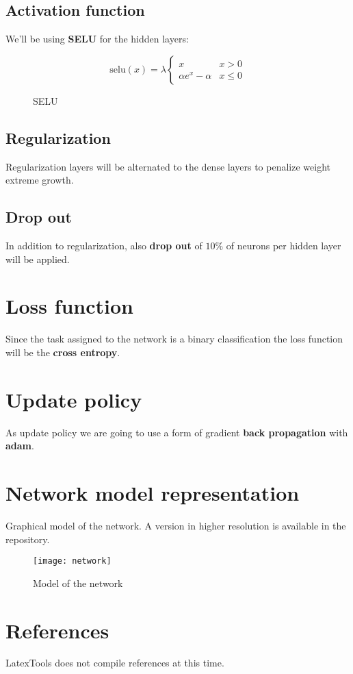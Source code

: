 \section{Activation function}
We'll be using \textbf{SELU} for the hidden layers:

\begin{figure}
	\[
		\text{selu}(x) = \lambda \begin{cases}
			x                 & x > 0    \\
			\alpha e^x-\alpha & x \leq 0
		\end{cases}
	\]
	\caption{SELU}
\end{figure}

\section{Regularization}
Regularization layers will be alternated to the dense layers to penalize weight extreme growth.

\section{Drop out}
In addition to regularization, also \textbf{drop out} of \(10\% \) of neurons per hidden layer will be applied.

\chapter{Loss function}
Since the task assigned to the network is a binary classification the loss function will be the \textbf{cross entropy}.

\chapter{Update policy}
As update policy we are going to use a form of gradient \textbf{back propagation} with \textbf{adam}.

\chapter{Network model representation}
Graphical model of the network. A version in higher resolution is available in the repository.
\begin{figure}
	\texttt{[image: network]}
	\caption{Model of the network}
\end{figure}



\chapter{References}
LatexTools does not compile references at this time.

